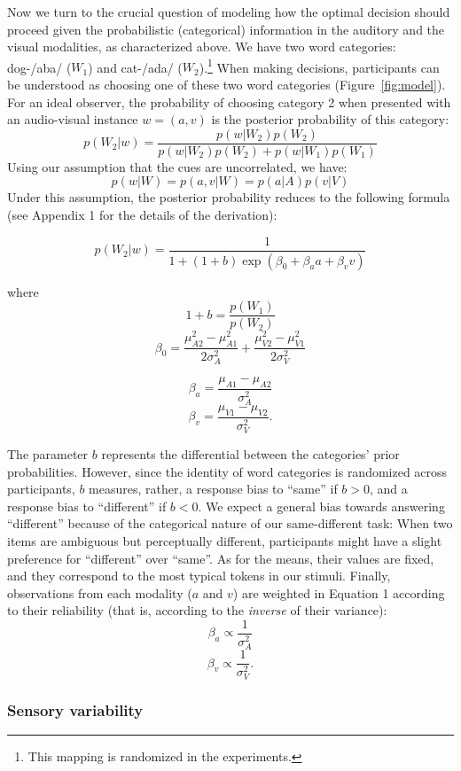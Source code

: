\documentclass[english,floatsintext,man]{apa6}
\theoremstyle{definition}
\theoremstyle{definition}
\theoremstyle{definition}
\theoremstyle{remark}
\begin{document}
Now we turn to the crucial question of modeling how the optimal decision
should proceed given the probabilistic (categorical) information in the
auditory and the visual modalities, as characterized above. We have two
word categories: dog-/aba/ (\(W_1\)) and cat-/ada/
(\(W_2\)).\footnote{This mapping is randomized in the experiments.} When
making decisions, participants can be understood as choosing one of
these two word categories (Figure~\ref{fig:model}). For an ideal
observer, the probability of choosing category 2 when presented with an
audio-visual instance \(w=(a,v)\) is the posterior probability of this
category: \[
p(W_2 | w)=\frac{p(w|W_2)p(W_2)}{p(w|W_2)p(W_2)+p(w|W_1)p(W_1)}
\] Using our assumption that the cues are uncorrelated, we have:
\[p(w | W) = p(a,v| W) = p(a| A)p(v| V)\] Under this assumption, the
posterior probability reduces to the following formula (see Appendix 1
for the details of the derivation):

\begin{equation}
 p(W_2 | w)=\frac{1}{1+(1+b)\exp(\beta_0+\beta_aa+\beta_vv)}
\end{equation}

where \[1+b=\frac{p(W_1)}{p(W_2)}\]
\[\beta_0=\frac{\mu^2_{A2}-\mu^2_{A1}}{2\sigma^2_{A}}+\frac{\mu^2_{V2}-\mu^2_{V1}}{2\sigma^2_{V}}\]

\[\beta_a=\frac{\mu_{A1}-\mu_{A2}}{\sigma^2_{A}}\]
\[\beta_v=\frac{\mu_{V1}-\mu_{V2}}{\sigma^2_{V}}.\]

The parameter \(b\) represents the differential between the categories'
prior probabilities. However, since the identity of word categories is
randomized across participants, \(b\) measures, rather, a response bias
to \enquote{same} if \(b > 0\), and a response bias to
\enquote{different} if \(b < 0\). We expect a general bias towards
answering \enquote{different} because of the categorical nature of our
same-different task: When two items are ambiguous but perceptually
different, participants might have a slight preference for
\enquote{different} over \enquote{same}. As for the means, their values
are fixed, and they correspond to the most typical tokens in our
stimuli. Finally, observations from each modality (\(a\) and \(v\)) are
weighted in Equation 1 according to their reliability (that is,
according to the \emph{inverse} of their variance):
\[\beta_a \propto \frac{1}{\sigma^2_{A}}\]
\[\beta_v \propto \frac{1}{\sigma^2_{V}}.\]

\subsubsection{Sensory variability}\label{sensory-variability}
\end{document}
